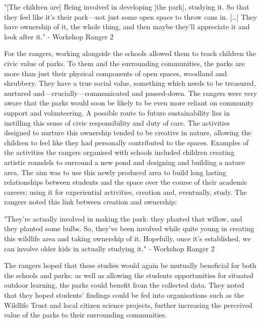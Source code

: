 \begin{displayquote}
"[The children are] Being involved in developing [the park], studying it. So that they feel like it's their park---not just some open space to throw cans in. […] They have ownership of it, the whole thing, and then maybe they’ll appreciate it and look after it." - Workshop Ranger 2
\end{displayquote}

For the rangers, working alongside the schools allowed them to teach children the civic value of parks. To them and the surrounding communities, the parks are more than just their physical components of open spaces, woodland and shrubbery. They have a true social value, something which needs to be treasured, nurtured and---crucially---communicated and passed-down. The rangers were very aware that the parks would soon be likely to be even more reliant on community support and volunteering. A possible route to future sustainability lies in instilling this sense of civic responsibility and duty of care. The activities designed to nurture this ownership tended to be creative in nature, allowing the children to feel like they had personally contributed to the spaces. Examples of the activities the rangers organised with schools included children creating artistic roundels to surround a new pond and designing and building a nature area. The aim was to use this newly produced area to build long lasting relationships between students and the space over the course of their academic careers: using it for experiential activities, creation and, eventually, study. The rangers noted this link between creation and ownership:

\begin{displayquote}
"They're actually involved in making the park: they planted that willow, and they planted some bulbs. So, they've been involved while quite young in creating this wildlife area and taking ownership of it. Hopefully, once it's established, we can involve older kids in actually studying it." - Workshop Ranger 2
\end{displayquote}

The rangers hoped that these studies would again be mutually beneficial for both the schools and parks: as well as allowing the students opportunities for situated outdoor learning, the parks could benefit from the collected data. They noted that they hoped students’ findings could be fed into organisations such as the Wildlife Trust and local citizen science projects, further increasing the perceived value of the parks to their surrounding communities.

